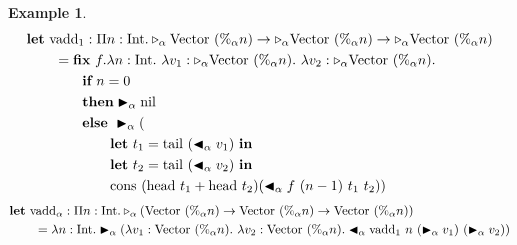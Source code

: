 \documentclass[9pt, a4paper]{extarticle}
\theoremstyle{break}
\newtheorem{ex}{Example}
\newcommand{\TW}{\triangleright}
\newcommand{\TB}{\blacktriangleright}
\newcommand{\TBL}{\blacktriangleleft}
\begin{document}
\begin{ex}
	\newcommand{\M}{\textrm{M}}
	\newcommand{\I}{\textrm{Int}}
	\newcommand{\Vn}{\text{Vector}\ (\%_\alpha n)}
	\begin{align*}
		 & \textbf{let}\ \text{vadd}_1 : \Pi n:\I.\TW_\alpha\Vn\to\TW_\alpha\Vn\to\TW_\alpha\Vn               \\
		 & \hspace{7mm} = \textbf{fix}\ f.\lambda n:\I.\ \lambda v_1:\TW_\alpha\Vn.\ \lambda v_2:\TW_\alpha\Vn.   \\
		 & \hspace{14mm} \textbf{if}\ n = 0                                                                   \\
		 & \hspace{14mm} \textbf{then} \TB_\alpha \text{nil}                                                  \\
		 & \hspace{14mm} \textbf{else}\ \TB_\alpha (                                                          \\
		 & \hspace{21mm} \textbf{let}\ t_1 = \text{tail}\ (\TBL_\alpha v_1)\ \textbf{in}                      \\
		 & \hspace{21mm} \textbf{let}\ t_2 = \text{tail}\ (\TBL_\alpha v_2)\ \textbf{in}                      \\
		 & \hspace{21mm} \text{cons}\ (\text{head}\ t_1 + \text{head}\ t_2) (\TBL_\alpha f\ (n-1)\ t_1\ t_2)) \\
	\end{align*}
	\begin{align*}
		 & \textbf{let}\ \text{vadd}_\alpha : \Pi n:\I.\TW_\alpha(\Vn\to\Vn\to\Vn)              \\
		 & \hspace{7mm} = \lambda n:\I.\TB_\alpha (\lambda v_1:\Vn.\ \lambda v_2:\Vn. \TBL_\alpha \text{vadd}_1\ n\ (\TB_\alpha v_1)\ (\TB_\alpha v_2)) \\
	\end{align*}
\end{ex}
\end{document}
